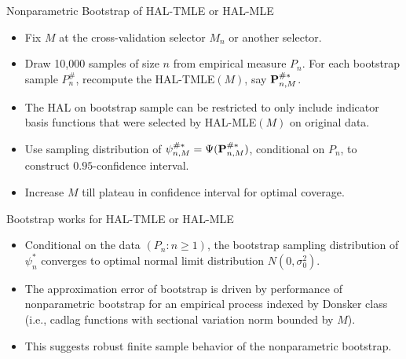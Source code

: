 \documentclass[t]{beamer}
\begin{document}
\begin{frame}{Nonparametric  Bootstrap of HAL-TMLE or HAL-MLE}
\begin{itemize}
\item Fix $M$ at the cross-validation selector $M_n$ or another selector.
\item Draw 10,000 samples of size $n$ from empirical measure $P_n$.
For each bootstrap sample $P_n^{\#}$, recompute the HAL-TMLE$(M)$, say ${\bf P}_{n,M}^{\#*}$.
\item The HAL on bootstrap sample can be restricted to only include indicator basis functions that were selected by HAL-MLE$(M)$ on original data.
\item Use sampling distribution of $\psi_{n,M}^{\#*}=\Psi({\bf P}_{n,M}^{\#*})$, conditional on $P_n$, to construct $0.95$-confidence interval.
\item Increase $M$ till plateau in confidence interval for optimal coverage.
\end{itemize}
\end{frame}

 \begin{frame}{Bootstrap works for HAL-TMLE or HAL-MLE}
 \begin{itemize}
 \item Conditional on the data $(P_n:n\geq 1)$, the bootstrap sampling distribution of  $\psi_n^*$ converges to optimal normal limit distribution $N(0,\sigma^2_0)$.
 \item The approximation error of bootstrap is driven by performance of nonparametric bootstrap for an empirical process indexed by Donsker class (i.e., cadlag functions with sectional variation norm bounded by $M$).
 \item This suggests  robust finite sample behavior of the nonparametric bootstrap.
 \end{itemize}
\end{frame}
\end{document}
